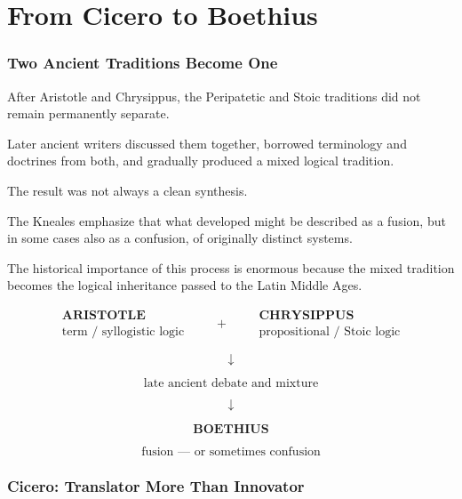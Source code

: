 \documentclass[11pt]{article}
\begin{document}

\part{From Cicero to Boethius}

\section{Two Ancient Traditions Become One}

After Aristotle and Chrysippus, the Peripatetic and Stoic
traditions did not remain permanently separate.

Later ancient writers discussed them together, borrowed
terminology and doctrines from both, and gradually produced a
mixed logical tradition.

The result was not always a clean synthesis.

The Kneales emphasize that what developed might be described as a
fusion, but in some cases also as a confusion, of originally
distinct systems.

The historical importance of this process is enormous because the
mixed tradition becomes the logical inheritance passed to the
Latin Middle Ages.

\begin{whiteboard}
\[
\begin{array}{c}
\textbf{ARISTOTLE}\\
\text{term / syllogistic logic}
\end{array}
\qquad
+
\qquad
\begin{array}{c}
\textbf{CHRYSIPPUS}\\
\text{propositional / Stoic logic}
\end{array}
\]

\[
\downarrow
\]

\[
\text{late ancient debate and mixture}
\]

\[
\downarrow
\]

\[
\boxed{\textbf{BOETHIUS}}
\]

\[
\text{fusion --- or sometimes confusion}
\]
\end{whiteboard}

\section{Cicero: Translator More Than Innovator}
\end{document}
